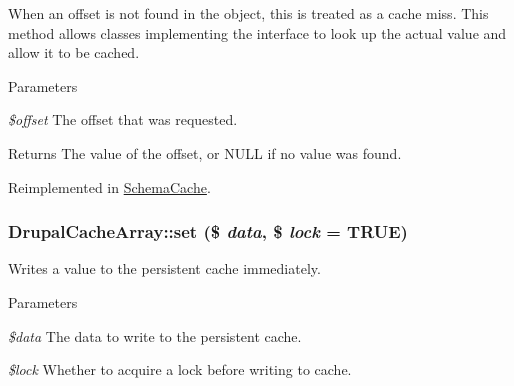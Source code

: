 When an offset is not found in the object, this is treated as a cache miss. This method allows classes implementing the interface to look up the actual value and allow it to be cached.


\begin{DoxyParams}{Parameters}
\item[{\em \$offset}]The offset that was requested.\end{DoxyParams}
\begin{DoxyReturn}{Returns}
The value of the offset, or NULL if no value was found. 
\end{DoxyReturn}


Reimplemented in \hyperlink{group__schemaapi_gadb0a973c0269c37d3389946d5b57c01c}{SchemaCache}.\hypertarget{group__schemaapi_ga9d99af903ba2660c09ca835e63c79118}{
\subsubsection[{set}]{\setlength{\rightskip}{0pt plus 5cm}DrupalCacheArray::set (\$ {\em data}, \/  \$ {\em lock} = {\ttfamily TRUE})}}
\label{group__schemaapi_ga9d99af903ba2660c09ca835e63c79118}
Writes a value to the persistent cache immediately.


\begin{DoxyParams}{Parameters}
\item[{\em \$data}]The data to write to the persistent cache. \item[{\em \$lock}]Whether to acquire a lock before writing to cache. \end{DoxyParams}


